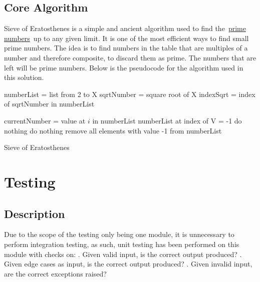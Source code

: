 \documentclass[]{article}
\begin{document}
\subsection{Core Algorithm}
Sieve of Eratosthenes is a simple and ancient algorithm used to find the \href{https://brilliant.org/wiki/prime-numbers/}{prime numbers} up to any given limit. It is one of the most efficient ways to find small prime numbers. The idea is to find numbers in the table that are multiples of a number and therefore composite, to discard them as prime. The numbers that are left will be prime numbers. Below is the pseudocode for the algorithm used in this solution.
\newline
\begin{algorithm}[H]
\SetAlgoLined
{}


numberList = list from 2 to X\;
sqrtNumber = square root of X\;
indexSqrt = index of sqrtNumber in numberList\;


{
    currentNumber = value at $i$ in numberList\;
    {
        {
             {
                numberList at index of V = -1
             }
             {
               do nothing
             }
        }
    }
    {
    do nothing
    }
}
remove all elements with value -1 from numberList\;
\caption{Sieve of Eratosthenes}
\end{algorithm}



\section{Testing}
\subsection{Description}
Due to the scope of the testing only being one module, it is unnecessary to perform integration testing, as such, unit testing has been performed on this module with checks on:
. Given valid input, is the correct output produced?
. Given edge cases as input, is the correct output produced?
. Given invalid input, are the correct exceptions raised?
\end{document}
